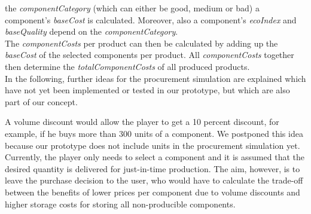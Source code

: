 the \textit{componentCategory} (which can either be good, medium or bad) a component's \textit{baseCost} is calculated. Moreover, also a component's \textit{ecoIndex} and \textit{baseQuality}
depend on the \textit{componentCategory}.\\
The \textit{componentCosts} per product can then be calculated by adding up the \textit{baseCost} of the selected components per product. All \textit{componentCosts} together then determine
the \textit{totalComponentCosts} of all produced products.\\

In the following, further ideas for the procurement simulation are explained which have not yet been implemented or tested in our prototype, but which are also part of our concept.

A volume discount would allow the player to get a 10 percent discount, for example, if he buys more than 300 units of a component. We postponed this idea because our prototype does not include units in the procurement simulation yet. Currently, the player only needs to select a component and it is assumed that the desired quantity is delivered for just-in-time production. 
The aim, however, is to leave the purchase decision to the user, who would have to calculate the trade-off between the benefits of lower prices per component due to volume discounts and higher storage costs for storing all non-producible components.